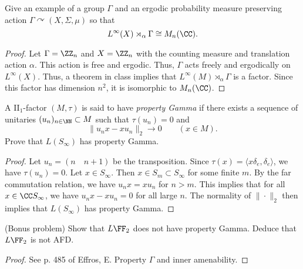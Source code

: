 \documentclass{article}
\begin{document}
 Give an example of a group $\Gamma$ and an ergodic probability measure preserving action $\Gamma \curvearrowright (X, \Sigma, \mu)$ so that
$$L^\infty(X) \rtimes_\alpha \Gamma \cong M_n(\CC).$$
\begin{proof}
  Let $\Gamma = \ZZ_n$ and $X = \ZZ_n$ with the counting measure and translation action $\alpha$.  This action is free and ergodic.  Thus, $\Gamma$ acts freely and ergodically on $L^\infty(X)$.  Thus, a theorem in class implies that $L^\infty(M) \rtimes_\alpha \Gamma$ is a factor.  Since this factor has dimension $n^2$, it is isomorphic to $M_n(\CC)$.
\end{proof}


 A II$_1$-factor $(M, \tau)$ is said to have \emph{property Gamma} if there exists a sequence of unitaries $(u_n)_{n \in \NN} \subset M$ such that $\tau(u_n) = 0$ and
$$ \| u_nx - xu_n \|_2 \to 0 \qquad (x \in M).$$
Prove that $L(S_\infty)$ has property Gamma.
\begin{proof}
  Let $u_n = (n \quad n+1)$ be the transposition. Since $\tau(x) = \langle x \delta_e, \delta_e \rangle$, we have $\tau(u_n) = 0$.  Let $x \in S_\infty$.  Then $x \in S_m \subset S_\infty$ for some finite $m$.  By the far commutation relation, we have $u_n x = x u_n$ for $n > m$.  This implies that for all $x \in \CC S_\infty$, we have $u_n x - x u_n = 0$ for all large $n$.  The normality of $\| \cdot \|_2$ then implies that $L(S_\infty)$ has property Gamma.  
\end{proof}

 (Bonus problem) Show that $L\FF_2$ does not have property Gamma. Deduce that $L \FF_2$ is not AFD.
\begin{proof}
  See p. 485 of Effros, E. Property $\Gamma$ and inner amenability.
\end{proof}
\end{document}
